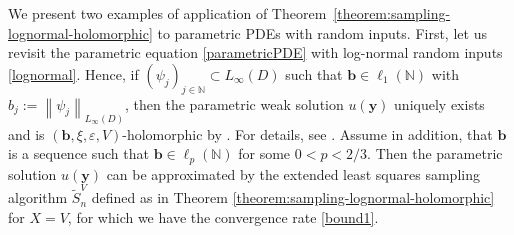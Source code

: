 \documentclass[11pt]{article}
\numberwithin{equation}{section}
\theoremstyle{definition}
\theoremstyle{remark}
\newcommand{\norm}[2]{\left\|{#1}\right\|_{#2}}
\newcommand{\bb}{{\boldsymbol{b}}}
\newcommand{\by}{{\boldsymbol{y}}}
\def\NN{{\mathbb N}}
\def\NN{{\mathbb N}}
\def\NN{{\mathbb N}}
\begin{document}
{ 	We present two examples of application of Theorem~\ref{theorem:sampling-lognormal-holomorphic} to parametric PDEs with random inputs. 
 First, let us revisit the parametric equation \eqref{parametricPDE} with 	log-normal random inputs \eqref{lognormal}. Hence, if
 $(\psi_j)_{j\in\NN}\subset L_\infty(D)$ such that $\bb\in\ell_1(\NN)$ with
 $b_j:=\norm{\psi_j}{L_\infty(D)}$, 
 then the parametric weak solution $u(\by)$ uniquely exists and
is {$(\bb,\xi,\varepsilon,V)$}-holomorphic by \cite[Theorem 4.11]{DNSZ2023}. For details, see \cite[Section 4.3.1]{DNSZ2023}. 
 	Assume in addition, that $\bb$ is a  sequence such that $\bb\in\ell_p(\NN)$
 for some $0 < p <2/3$. Then the parametric solution $u(\by)$ can be approximated by the extended least squares sampling algorithm $\tilde{S}_n^V$ defined as in Theorem \ref{theorem:sampling-lognormal-holomorphic} for $X=V$, for which we have the convergence rate \eqref{bound1}.
 	
}
\end{document}
